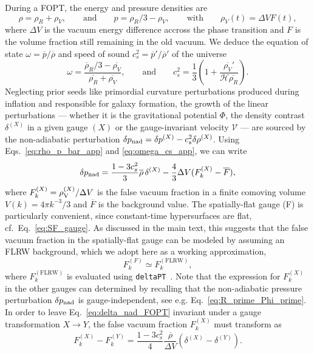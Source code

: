 \documentclass[twocolumn,superscriptaddress,aps,preprintnumbers,amsmath,amssymb,prl,footinbib]{revtex4-2}
\newcommand{\deltaPT}{{\texttt{deltaPT}}}
\begin{document}
During a FOPT, the energy and pressure densities are
\begin{equation}
\label{eq:rho_p_bar_app}
\rho=\rho_R+\rho_V,\qquad \textrm{and}\qquad p=\rho_R/3-\rho_V,\qquad \textrm{with}\qquad \rho_V(t) = \Delta V F(t),
\end{equation}
where $\Delta V$ is the vacuum energy difference accross the phase transition and $F$ is the volume fraction still remaining in the old vacuum.
We deduce the equation of state $\omega=\overline{p}/\overline{\rho}$ and speed of sound $c_s^2=\overline{p}'/\overline{\rho}'$  of the universe
\begin{equation}
\label{eq:omega_cs_app}
\omega = \frac{\overline{\rho}_R/3-\overline{\rho_V}}{\overline{\rho_R}+\overline{\rho_V}},\qquad \textrm{and}\qquad  c_s^2 = \frac{1}{3}\left(1+\frac{\overline{\rho_V}'}{\mathcal{H}\overline{\rho_{R}}} \right).
\end{equation}
Neglecting prior seeds like primordial curvature perturbations produced during inflation and responsible for galaxy formation, the growth of the linear perturbations --- whether it is the gravitational potential $\Phi$, the density contrast $\delta^{(X)}$ in a given gauge $(X)$ or the gauge-invariant velocity $\mathcal{V}$ --- are sourced by the non-adiabatic perturbation $\delta p_{\rm nad} =\delta p^{(X)}-c_s^2\delta\rho^{(X)}$. Using Eqs.~\eqref{eq:rho_p_bar_app} and \eqref{eq:omega_cs_app}, we can write
\begin{equation}
\label{eq:delta_nad_FOPT}
\delta p_{\rm nad} = \frac{1-3c_s^2}{3}\overline{\rho}\,\delta^{(X)}-\frac{4}{3}\Delta V(F_k^{(X)}-\overline{F}),
\end{equation}
where $F_k^{(X)}=\rho_{\rm V}^{(X)}/\Delta V$ is the false vacuum fraction in a finite comoving volume $V(k)=4\pi k^{-3}/3$ and $\overline{F}$ is the background value.
The spatially-flat gauge (F) is particularly convenient,
since constant-time hypersurfaces are flat, cf.~Eq.~\eqref{eq:SF_gauge}. As discussed in the main text, this suggests that the false
vacuum fraction in the spatially-flat gauge can be modeled by assuming an FLRW
background, which we adopt here as a working approximation,
\begin{equation}
\label{eq:F_k_F_k_FLRW}
F_k^{(F)} \simeq F_k^{(\mathrm{FLRW})},
\end{equation}
where $F_k^{(\mathrm{FLRW})}$ is evaluated using \deltaPT~\cite{Lewicki:2024ghw}.
Note that the expression for $F_k^{(X)}$ in the other gauges can determined by recalling that the non-adiabatic pressure perturbation $\delta p_{\rm nad}$ is gauge-independent, see e.g. Eq.~\eqref{eq:R_prime_Phi_prime}. In order to leave Eq.~\eqref{eq:delta_nad_FOPT} invariant under a gauge transformation $X\to Y$, the false vacuum fraction $F_k^{(X)}$ must transform as
\begin{equation}
F_k^{(X)}- F_k^{(Y)} = \frac{1-3c_s^2}{4}\frac{\overline{\rho}}{\Delta V}\left(\delta^{(X)}-\delta^{(Y)}\right).
\end{equation}
\end{document}
